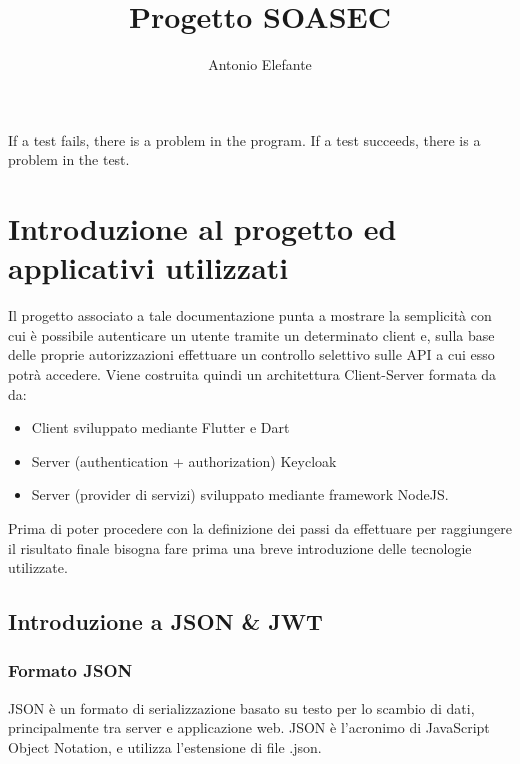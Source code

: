 \documentclass[twoside]{report}
\title{Progetto SOASEC}
\author{Antonio Elefante}
\begin{document}
\clearpage\null \thispagestyle{empty} 

\clearpage 
\thispagestyle{empty} 
\null
 \vspace{20em}
\begin{fquote}
	 If a test fails, there is a problem in the program. If a test succeeds, there is a problem in the test.
\end{fquote}

\null
 \newpage

\tableofcontents %
\newpage

\thispagestyle{empty}


\chapter{Introduzione al progetto ed applicativi utilizzati}
\thispagestyle{empty} 
Il progetto associato a tale documentazione punta a mostrare la semplicità con cui è possibile autenticare un utente tramite un determinato client e, sulla base delle proprie autorizzazioni effettuare un controllo selettivo sulle API a cui esso potrà accedere.
\bigbreak
Viene costruita quindi un architettura Client-Server formata da da:

\begin{itemize}
    \item Client sviluppato mediante Flutter e Dart
    \item Server (authentication + authorization) Keycloak
    \item Server (provider di servizi) sviluppato mediante framework NodeJS.
\end{itemize}

\bigbreak
Prima di poter procedere con la definizione dei passi da effettuare per raggiungere il risultato finale bisogna fare prima una breve introduzione delle tecnologie utilizzate.
\newpage
\section{Introduzione a JSON \& JWT}
\subsection{Formato JSON}
JSON è un formato di serializzazione basato su testo per lo scambio di dati, principalmente tra server e applicazione web. JSON è l'acronimo di JavaScript Object Notation, e utilizza l'estensione di file .json.
\end{document}
